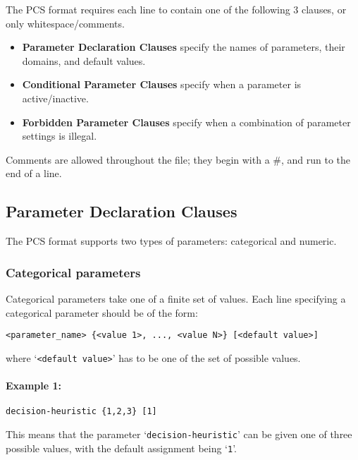 \documentclass[manual.tex]{subfiles}
\begin{document}
The PCS format requires each line to contain one of the following 3 clauses, or only whitespace/comments.
\begin{itemize}
\item \textbf{Parameter Declaration Clauses} specify the names of parameters, their domains, and default values.
\item \textbf{Conditional Parameter Clauses} specify when a parameter is active/inactive.
\item \textbf{Forbidden Parameter Clauses} specify when a combination of parameter settings is illegal.
\end{itemize}
Comments are allowed throughout the file; they begin with a \#, and run to the end of a line. 

\subsection{Parameter Declaration Clauses}\label{sec:param_decl_clauses}

The PCS format supports two types of parameters: categorical and numeric. 

\subsubsection{Categorical parameters}
Categorical parameters take one of a finite set of values. Each line specifying a categorical parameter should be of the form:

\begin{verbatim}
<parameter_name> {<value 1>, ..., <value N>} [<default value>]
\end{verbatim}
where `\texttt{<default value>}' has to be one of the set of possible values. 

\paragraph{Example 1:}
\begin{verbatim}
decision-heuristic {1,2,3} [1]
\end{verbatim}
This means that the parameter `\texttt{decision-heuristic}' can be given one of three possible values, with the default assignment being `\texttt{1}'.
\end{document}
